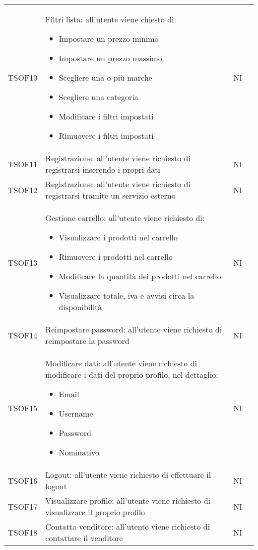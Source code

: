 \begin{center}
\begin{longtable}[!h]{p{50px} p{245px} p{75px} p{50px}}
        TSOF10  & Filtri lista: all'utente viene chiesto di: \begin{itemize} \item Impostare un prezzo minimo \item Impostare un prezzo massimo \item Scegliere una o pi\`u marche \item Scegliere una categoria \item Modificare i filtri impostati \item Rimuovere i filtri impostati \end{itemize} & NI \\
        TSOF11  & Registrazione: all'utente viene richiesto di registrarsi inserendo i propri dati& NI \\
        TSOF12  & Registrazione: all'utente viene richiesto di registrarsi tramite un servizio esterno & NI \\
        TSOF13  & Gestione carrello: all'utente viene richiesto di: \begin{itemize} \item Visualizzare i prodotti nel carrello \item Rimuovere i prodotti nel carrello \item Modificare la quantit\`a dei prodotti nel carrello \item Visualizzare totale, iva e avvisi circa la disponibilit\`a \end{itemize}  & NI \\
        TSOF14  & Reimpostare password: all'utente viene richiesto di reimpostare la password & NI \\
        TSOF15  & Modificare dati: all'utente viene richiesto di modificare i dati del proprio profilo, nel dettaglio: \begin{itemize} \item Email \item Username \item Password \item Nominativo \end{itemize} & NI \\
        TSOF16  & Logout: all'utente viene richiesto di effettuare il logout  & NI \\
        TSOF17  & Visualizzare profilo: all'utente viene richiesto di visualizzare il proprio profilo & NI \\
        TSOF18  & Contatta venditore: all'utente viene richiesto di contattare il venditore & NI \\

\end{longtable}
\end{center}

